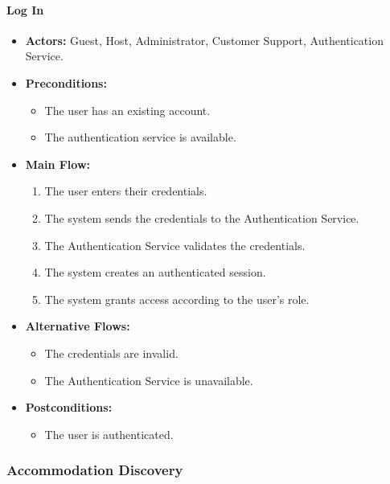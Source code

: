 \paragraph{Log In}

\begin{itemize}
    \item \textbf{Actors:} Guest, Host, Administrator, Customer Support, Authentication Service.
    
    \item \textbf{Preconditions:}
    \begin{itemize}
        \item The user has an existing account.
        \item The authentication service is available.
    \end{itemize}
    
    \item \textbf{Main Flow:}
    \begin{enumerate}
        \item The user enters their credentials.
        \item The system sends the credentials to the Authentication Service.
        \item The Authentication Service validates the credentials.
        \item The system creates an authenticated session.
        \item The system grants access according to the user's role.
    \end{enumerate}
    
    \item \textbf{Alternative Flows:}
    \begin{itemize}
        \item The credentials are invalid.
        \item The Authentication Service is unavailable.
    \end{itemize}
    
    \item \textbf{Postconditions:}
    \begin{itemize}
        \item The user is authenticated.
    \end{itemize}
\end{itemize}


\subsubsection{Accommodation Discovery}

